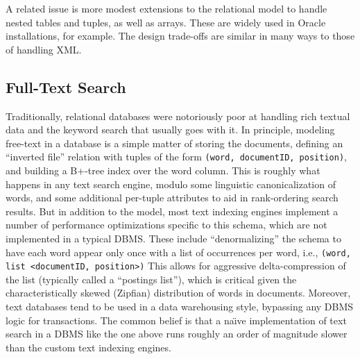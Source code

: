\documentclass[b5paper,11pt,twoside,openright]{book}
\begin{document}
A related issue is more modest extensions to the relational model to
handle nested tables and tuples, as well as arrays. These are widely
used in Oracle installations, for example. The design trade-offs are
similar in many ways to those of handling XML.

\hypertarget{full-text-search}{%
\subsection{Full-Text Search}\label{full-text-search}}

Traditionally, relational databases were notoriously poor at handling
rich textual data and the keyword search that usually goes with it. In
principle, modeling free-text in a database is a simple matter of
storing the documents, defining an ``inverted file'' relation with
tuples of the form \texttt{(word, documentID, position)}, and building a B+-tree
index over the word column. This is roughly what happens in any text
search engine, modulo some linguistic canonicalization of words, and
some additional per-tuple attributes to aid in rank-ordering search
results. But in addition to the model, most text indexing engines
implement a number of performance optimizations specific to this schema,
which are not implemented in a typical DBMS. These include
``denormalizing'' the schema to have each word appear only once with a
list of occurrences per word, i.e., \texttt{(word, list \textless{}documentID,
position\textgreater{})} This allows for aggressive delta-compression of
the list (typically called a ``postings list''), which is critical given
the characteristically skewed (Zipfian) distribution of words in
documents. Moreover, text databases tend to be used in a data
warehousing style, bypassing any DBMS logic for transactions. The common
belief is that a na{\"\i}ve implementation of text search in a DBMS like the
one above runs roughly an order of magnitude slower than the custom text
indexing engines.
\end{document}
